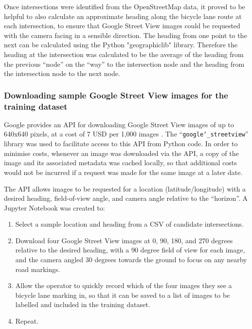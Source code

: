 \documentclass[11pt,twoside]{report}
\begin{document}
Once intersections were identified from the OpenStreetMap data, it proved to be helpful to also calculate an approximate heading along the bicycle lane route at each intersection, to ensure that Google Street View images could be requested with the camera facing in a sensible direction.  The heading from one point to the next can be calculated using the Python "geographiclib" library.  Therefore the heading at the intersection was calculated to be the average of the heading from the previous ``node'' on the ``way'' to the intersection node and the heading from the intersection node to the next node.

\subsubsection{Downloading sample Google Street View images for the training dataset}
\label{s:sample}

Google provides an API for downloading Google Street View images of up to 640x640 pixels, at a cost of 7 USD per 1,000 images \cite{gsv_billing}.  The ``\texttt{google\char`_streetview}'' library was used to facilitate access to this API from Python code.  In order to minimise costs, whenever an image was downloaded via the API, a copy of the image and its associated metadata was cached locally, so that additional costs would not be incurred if a request was made for the same image at a later date.

The API allows images to be requested for a location (latitude/longitude) with a desired heading, field-of-view angle, and camera angle relative to the ``horizon''.  A Jupyter Notebook was created to:

\begin{enumerate}
	\item{Select a sample location and heading from a CSV of candidate intersections.}
	\item{Download four Google Street View images at 0, 90, 180, and 270 degrees relative to the desired heading, with a 90 degree field of view for each image, and the camera angled 30 degrees towards the ground to focus on any nearby road markings.}
	\item{Allow the operator to quickly record which of the four images they see a bicycle lane marking in, so that it can be saved to a list of images to be labelled and included in the training dataset.}
	\item{Repeat.}
\end{enumerate}
\end{document}
